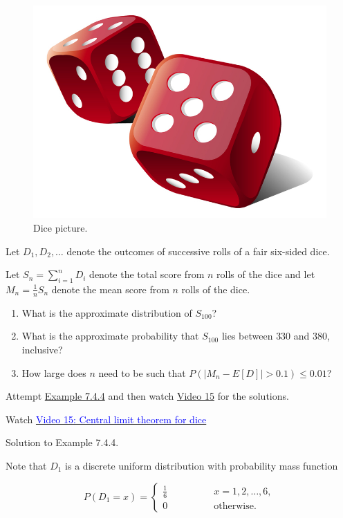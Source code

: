 \documentclass[
]{book}
\providecommand{\tightlist}{%
  \setlength{\itemsep}{0pt}\setlength{\parskip}{0pt}}
\begin{document}
\begin{figure}
\includegraphics[width=0.8\linewidth]{Images/dice1} \caption{Dice picture.}\label{fig:dice1}
\end{figure}

Let \(D_1, D_2, \ldots\) denote the outcomes of successive rolls of a fair six-sided dice.

Let \(S_n = \sum_{i=1}^n D_i\) denote the total score from \(n\) rolls of the dice and let \(M_n = \frac{1}{n} S_n\) denote the mean score from \(n\) rolls of the dice.

\begin{enumerate}
\def\labelenumi{(\alph{enumi})}
\tightlist
\item
  What is the approximate distribution of \(S_{100}\)?\\
\item
  What is the approximate probability that \(S_{100}\) lies between \(330\) and \(380\), inclusive?\\
\item
  How large does \(n\) need to be such that \(P(|M_n - E[D]|>0.1) \leq 0.01\)?\\
\end{enumerate}

Attempt \protect\hyperlink{Sec_clt:exer:clt_dice}{Example 7.4.4} and then watch \protect\hyperlink{video15}{Video 15} for the solutions.

Watch \href{https://mediaspace.nottingham.ac.uk/media/Dice+CLT+FINAL+VERSION/1_f2v50ix1}{\textcolor{blue}{Video 15: Central limit theorem for dice}}

Solution to Example 7.4.4.

Note that \(D_1\) is a discrete uniform distribution with probability mass function

\[ P(D_1 =x) = \left\{ \begin{array}{ll} \frac{1}{6} \qquad \qquad & x=1,2,\ldots, 6, \\ 0 & \mbox{otherwise}. \end{array} \right. \]
\end{document}
